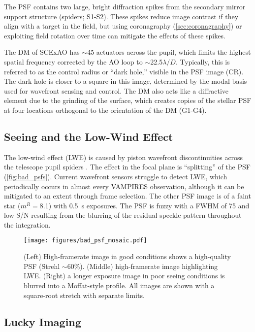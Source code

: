 The PSF contains two large, bright diffraction spikes from the secondary mirror support structure (spiders; S1-S2). These spikes reduce image contrast if they align with a target in the field, but using coronagraphy (\autoref{sec:coronagraphy}) or exploiting field rotation over time can mitigate the effects of these spikes.

The DM of SCExAO has $\sim$45 actuators across the pupil, which limits the highest spatial frequency corrected by the AO loop to $\sim$22.5$\lambda/D$. Typically, this is referred to as the control radius or ``dark hole,'' visible in the PSF image (CR). The dark hole is closer to a square in this image, determined by the modal basis used for wavefront sensing and control. The DM also acts like a diffractive element due to the grinding of the surface, which creates copies of the stellar PSF at four locations orthogonal to the orientation of the DM (G1-G4).

\subsection{Seeing and the Low-Wind Effect}
The low-wind effect (LWE) is caused by piston wavefront discontinuities across the telescope pupil spiders  \citep{milli_low_2018}. The effect in the focal plane is ``splitting'' of the PSF (\autoref{fig:bad_psfs}). Current wavefront sensors struggle to detect LWE, which periodically occurs in almost every VAMPIRES observation, although it can be mitigated to an extent through frame selection. The other PSF image is of a faint star ($m^R=$8.1) with \SI{0.5}{\second} exposures. The PSF is fuzzy with a FWHM of \SI{75}{\mas} and low S/N resulting from the blurring of the residual speckle pattern throughout the integration.

\begin{figure}
    \centering
    \texttt{[image: figures/bad\_psf\_mosaic.pdf]}
    \caption{(Left) High-framerate image in good conditions shows a high-quality PSF (Strehl $\sim$60\%). (Middle) high-framerate image highlighting LWE. (Right) a longer exposure image in poor seeing conditions is blurred into a Moffat-style profile. All images are shown with a square-root stretch with separate limits.\label{fig:bad_psfs}}
\end{figure}

\subsection{Lucky Imaging}

